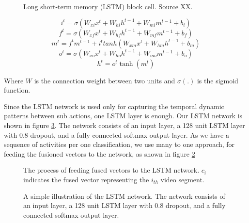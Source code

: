 \begin{figure}
  \centering
  
  \caption{Long short-term memory (LSTM) block cell. Source XX.}\label{fi:lstmblock}
\end{figure}

\begin{equation}
i^{t} = \sigma (W_{xi}x^t + W_{hi}h^{t-1} + W_{mi}m^{t-1} + b_{i})
\end{equation}
\begin{equation}
f^{t} = \sigma (W_{xf}x^t + W_{hf}h^{t-1} + W_{mf}m^{t-1} + b_{f})
\end{equation}
\begin{equation}
m^{t} = f^tm^{t-1} + i^ttanh(W_{xm}x^t + W_{hm}h^{t-1} + b_{m})
\end{equation}
\begin{equation}
o^{t} = \sigma (W_{xo}x^t + W_{ho}h^{t-1} + W_{mo}m^{t-1} + b_{o})
\end{equation}
\begin{equation}
h^t = o^t\tanh(m^t)
\end{equation}

Where $W$ is the connection weight between two units and $\sigma(.)$ is the sigmoid function.

Since the LSTM network is used only for capturing the temporal dynamic patterns between sub actions, one LSTM layer is enough.
Our LSTM network is shown in figure \ref{fi:layers}. The network consists of an input layer, a 128 unit LSTM layer with 0.8 dropout, and
a fully connected softmax output layer. As we have a sequence of activities per one classification, we use many to one approach,
for feeding the fusioned vectors to the network, as shown in figure \ref{fi:lstm}

\begin{figure}
  \centering
  
  \caption{The process of feeding fused vectors to the LSTM network. $c_{i}$ indicates the fused vector representing the $i_{th}$
  video segment.}\label{fi:lstm}
\end{figure}

\begin{figure}
  \centering
  
  \caption{A simple illustration of the LSTM network. The network consists of an input layer, a 128 unit LSTM layer with 0.8 dropout, and
a fully connected softmax output layer.}\label{fi:layers}
\end{figure}

